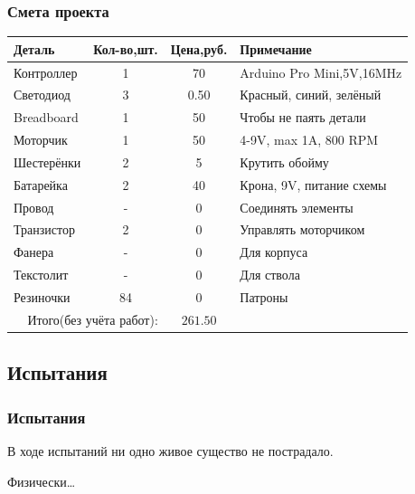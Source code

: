 \begin{frame}
    \frametitle{Смета проекта \myDevice}
    
    \begin{center}
        \begin{tabular}{l|c|c|l}
            \hline\hline
            Деталь & Кол-во,шт. & Цена,руб. & Примечание \\
            \hline\hline
            Контроллер & 1  & 70   & Arduino Pro Mini,5V,16MHz\\
            Светодиод  & 3  & 0.50 & Красный, синий, зелёный\\
            Breadboard & 1  & 50   & Чтобы не паять детали\\
            Моторчик   & 1  & 50   & 4-9V, max 1A, 800 RPM\\
            Шестерёнки & 2  & 5    & Крутить обойму\\
            Батарейка  & 2  & 40   & Крона, 9V, питание схемы\\
            Провод     & -  & 0    & Соединять элементы\\
            Транзистор & 2  & 0    & Управлять моторчиком\\
            Фанера     & -  & 0    & Для корпуса\\
            Текстолит  & -  & 0    & Для ствола\\
            Резиночки  & 84 & 0    & Патроны\\ \hline
            \multicolumn{2}{r|}{Итого(\alert{без учёта работ}):} & \multicolumn{1}{c}{\alert{$261.50$}} & \\
        \end{tabular}
    \end{center}
\end{frame}


\subsection{Испытания \myDevice}

\begin{frame}
    \frametitle{Испытания \myDevice}
    \begin{center}
        В ходе испытаний ни одно живое существо не пострадало.

        Физически\ldots    
    \end{center}    
\end{frame}


